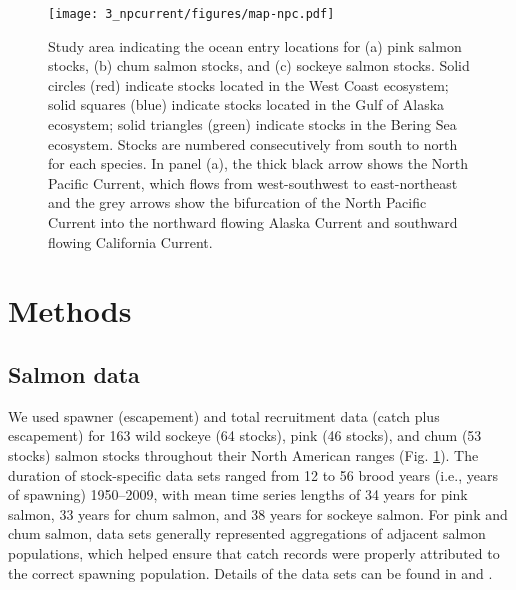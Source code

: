 \begin{figure}[htbp]
  \centering \texttt{[image: 3\_npcurrent/figures/map-npc.pdf]}
  \caption[Study area indicating the ocean entry locations for salmon
           stocks by species]{Study area indicating the ocean entry locations
           for (a) pink salmon stocks, (b) chum salmon stocks, and (c) sockeye
           salmon stocks. Solid circles (red) indicate stocks located in the
           West Coast ecosystem; solid squares (blue) indicate stocks located in
           the Gulf of Alaska ecosystem; solid triangles (green) indicate stocks
           in the Bering Sea ecosystem. Stocks are numbered consecutively from
           south to north for each species. In panel (a), the thick black arrow
           shows the North Pacific Current, which flows from west-southwest to
           east-northeast and the grey arrows show the bifurcation of the North
           Pacific Current into the northward flowing Alaska Current and
           southward flowing California Current.}
  \label{fig:npc:1}
\end{figure}



\section{Methods}

\subsection{Salmon data}

We used spawner (escapement) and total recruitment data (catch plus escapement)
for 163 wild sockeye (64 stocks), pink (46 stocks), and chum (53 stocks) salmon
stocks throughout their North American ranges (Fig. \ref{fig:npc:1}). The
duration of stock-specific data sets ranged from 12 to 56 brood years (i.e.,
years of spawning) 1950--2009, with mean time series lengths of 34 years for
pink salmon, 33 years for chum salmon, and 38 years for sockeye salmon. For pink
and chum salmon, data sets generally represented aggregations of adjacent salmon
populations, which helped ensure that catch records were properly attributed to
the correct spawning population. Details of the data sets can be found in
\citet{Peterman2012} and \citet{Malick2016a}.

